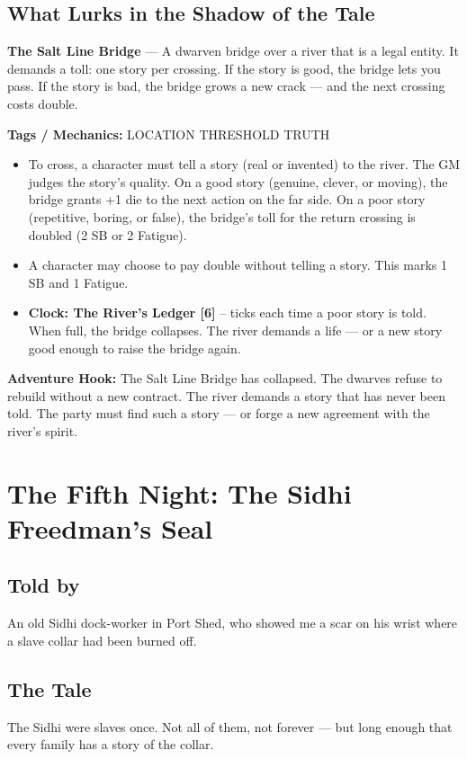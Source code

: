 \documentclass[10pt,twoside]{book}
\newcommand{\tag}[1]{\textsc{#1}}
\begin{document}
\section*{What Lurks in the Shadow of the Tale}
\begin{infobox}
\textbf{The Salt Line Bridge} --- A dwarven bridge over a river that is a legal entity. It demands a toll: one story per crossing. If the story is good, the bridge lets you pass. If the story is bad, the bridge grows a new crack --- and the next crossing costs double.

\textbf{Tags / Mechanics:} \tag{LOCATION} \tag{THRESHOLD} \tag{TRUTH}

\begin{itemize}
\item To cross, a character must tell a story (real or invented) to the river. The GM judges the story's quality. On a good story (genuine, clever, or moving), the bridge grants +1 die to the next action on the far side. On a poor story (repetitive, boring, or false), the bridge's toll for the return crossing is doubled (2 SB or 2 Fatigue).
\item A character may choose to pay double without telling a story. This marks 1 SB and 1 Fatigue.
\item \textbf{Clock: The River's Ledger [6]} -- ticks each time a poor story is told. When full, the bridge collapses. The river demands a life --- or a new story good enough to raise the bridge again.
\end{itemize}

\textbf{Adventure Hook:} The Salt Line Bridge has collapsed. The dwarves refuse to rebuild without a new contract. The river demands a story that has never been told. The party must find such a story --- or forge a new agreement with the river's spirit.
\end{infobox}

\chapter{The Fifth Night: The Sidhi Freedman's Seal}

\section*{Told by}
An old Sidhi dock-worker in Port Shed, who showed me a scar on his wrist where a slave collar had been burned off.

\section*{The Tale}
The Sidhi were slaves once. Not all of them, not forever --- but long enough that every family has a story of the collar.
\end{document}
